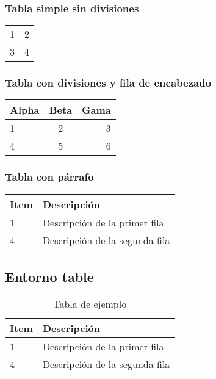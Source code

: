 \documentclass{article}
\begin{document}
\subsubsection{Tabla simple sin divisiones}

\begin{tabular}{c c}
1 & 2 \\
3 & 4 \\
\end{tabular}

\subsubsection{Tabla con divisiones y fila de encabezado}

\begin{tabular}{| l | c | r |}
\hline
Alpha & Beta & Gama \\
\hline \hline
1 & 2 & 3 \\
\hline
4 & 5 & 6 \\
\hline
\end{tabular}

\subsubsection{Tabla con párrafo}

\begin{tabular}{| l | p{2.5cm} |}
\hline
Item & Descripción \\
\hline \hline
1 & Descripción de la primer fila \\
\hline
4 & Descripción de la segunda fila \\
\hline
\end{tabular}

\subsection{Entorno table}

\begin{table}[h]
  \centering
  \begin{tabular}{| l | p{2.5cm} |}
  \hline
  Item & Descripción \\
  \hline \hline
  1 & Descripción de la primer fila \\
  \hline
  4 & Descripción de la segunda fila \\
  \hline
  \end{tabular}
  \caption{Tabla de ejemplo}
  \label{tab:tabla}
\end{table}
\end{document}
